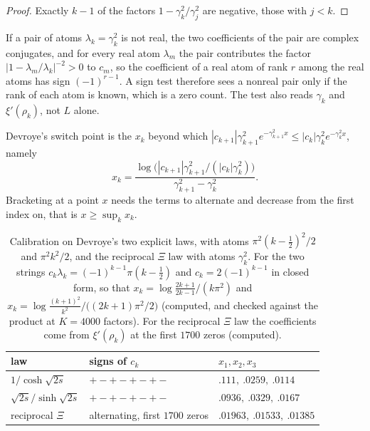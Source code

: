 \begin{proof}
Exactly $k-1$ of the factors $1-\gamma_k^2/\gamma_j^2$ are negative, those with $j<k$.
\end{proof}

\begin{remark}
If a pair of atoms $\lambda_k=\gamma_k^2$ is not real, the two coefficients of the pair are complex conjugates, and for every real atom $\lambda_m$ the pair contributes the factor $|1-\lambda_m/\lambda_k|^{-2}>0$ to $c_m$, so the coefficient of a real atom of rank $r$ among the real atoms has sign $(-1)^{r-1}$. A sign test therefore sees a nonreal pair only if the rank of each atom is known, which is a zero count. The test also reads $\gamma_k$ and $\xi'(\rho_k)$, not $L$ alone.
\end{remark}

Devroye's switch point is the $x_k$ beyond which $|c_{k+1}|\gamma_{k+1}^2e^{-\gamma_{k+1}^2x}\le|c_k|\gamma_k^2e^{-\gamma_k^2x}$, namely
\[
x_k=\frac{\log\big(|c_{k+1}|\gamma_{k+1}^2/(|c_k|\gamma_k^2)\big)}{\gamma_{k+1}^2-\gamma_k^2}.
\]
Bracketing at a point $x$ needs the terms to alternate and decrease from the first index on, that is $x\ge\sup_kx_k$.

\begin{table}[h]\centering\small
\begin{tabular}{lll}
\toprule
law & signs of $c_k$ & $x_1,x_2,x_3$\\
\midrule
$1/\cosh\sqrt{2s}$ & $+-+-+-+-$ & $.111,\ .0259,\ .0114$\\
$\sqrt{2s}/\sinh\sqrt{2s}$ & $+-+-+-+-$ & $.0936,\ .0329,\ .0167$\\
reciprocal $\Xi$ & alternating, first $1700$ zeros & $.01963,\ .01533,\ .01385$\\
\bottomrule
\end{tabular}
\caption{Calibration on Devroye's two explicit laws, with atoms $\pi^2(k-\frac12)^2/2$ and $\pi^2k^2/2$, and the reciprocal $\Xi$ law with atoms $\gamma_k^2$. For the two strings $c_k\lambda_k=(-1)^{k-1}\pi(k-\frac12)$ and $c_k=2(-1)^{k-1}$ in closed form, so that $x_k=\log\frac{2k+1}{2k-1}/(k\pi^2)$ and $x_k=\log\frac{(k+1)^2}{k^2}/\big((2k+1)\pi^2/2\big)$ (computed, and checked against the product at $K=4000$ factors). For the reciprocal $\Xi$ law the coefficients come from $\xi'(\rho_k)$ at the first $1700$ zeros (computed).}\label{ev:tab:devroye}
\end{table}

